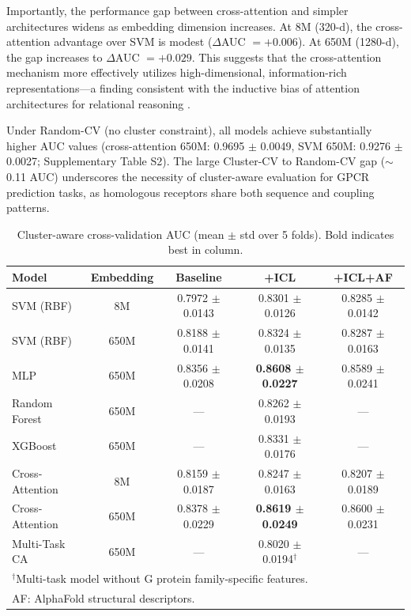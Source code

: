 \documentclass[11pt,a4paper]{article}
\begin{document}
Importantly, the performance gap between cross-attention and simpler architectures widens as embedding dimension increases. At 8M (320-d), the cross-attention advantage over SVM is modest ($\Delta$AUC $= +0.006$). At 650M (1280-d), the gap increases to $\Delta$AUC $= +0.029$. This suggests that the cross-attention mechanism more effectively utilizes high-dimensional, information-rich representations---a finding consistent with the inductive bias of attention architectures for relational reasoning \cite{vaswani2017attention}.

Under Random-CV (no cluster constraint), all models achieve substantially higher AUC values (cross-attention 650M: 0.9695 $\pm$ 0.0049, SVM 650M: 0.9276 $\pm$ 0.0027; Supplementary Table S2). The large Cluster-CV to Random-CV gap ($\sim$0.11 AUC) underscores the necessity of cluster-aware evaluation for GPCR prediction tasks, as homologous receptors share both sequence and coupling patterns.

\begin{table}[t]
\centering
\caption{Cluster-aware cross-validation AUC (mean $\pm$ std over 5 folds). Bold indicates best in column.}
\label{tab:main}
\begin{tabular}{lcccc}
\toprule
Model & Embedding & Baseline & +ICL & +ICL+AF \\
\midrule
SVM (RBF)       & 8M   & 0.7972 $\pm$ 0.0143 & 0.8301 $\pm$ 0.0126 & 0.8285 $\pm$ 0.0142 \\
SVM (RBF)       & 650M & 0.8188 $\pm$ 0.0141 & 0.8324 $\pm$ 0.0135 & 0.8287 $\pm$ 0.0163 \\
MLP             & 650M & 0.8356 $\pm$ 0.0208 & \textbf{0.8608 $\pm$ 0.0227} & 0.8589 $\pm$ 0.0241 \\
Random Forest   & 650M & ---                & 0.8262 $\pm$ 0.0193 & --- \\
XGBoost        & 650M & ---                & 0.8331 $\pm$ 0.0176 & --- \\
Cross-Attention & 8M   & 0.8159 $\pm$ 0.0187 & 0.8247 $\pm$ 0.0163 & 0.8207 $\pm$ 0.0189 \\
Cross-Attention & 650M & 0.8378 $\pm$ 0.0229 & \textbf{0.8619 $\pm$ 0.0249} & 0.8600 $\pm$ 0.0231 \\
Multi-Task CA   & 650M & ---                & 0.8020 $\pm$ 0.0194$^\dagger$ & --- \\
\bottomrule
\multicolumn{5}{l}{\small $^\dagger$Multi-task model without G protein family-specific features.} \\
\multicolumn{5}{l}{\small AF: AlphaFold structural descriptors.}
\end{tabular}
\end{table}
\end{document}
